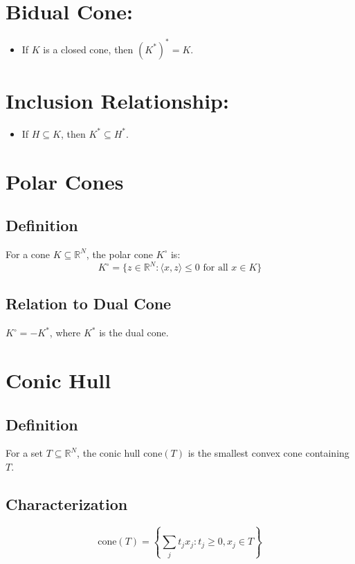 \documentclass{article}
\begin{document}
\section*{Bidual Cone:}
\begin{itemize}
    \item If $K$ is a closed cone, then $(K^*)^* = K$.
\end{itemize}

\section*{Inclusion Relationship:}
\begin{itemize}
    \item If $H \subseteq K$, then $K^* \subseteq H^*$.
\end{itemize}




\section*{Polar Cones}

\subsection*{Definition}
For a cone \( K \subseteq \mathbb{R}^N \), the polar cone \( K^\circ \) is:
\[
K^\circ = \{ z \in \mathbb{R}^N : \langle x, z \rangle \leq 0 \text{ for all } x \in K \}
\]

\subsection*{Relation to Dual Cone}
\( K^\circ = -K^* \), where \( K^* \) is the dual cone.

\section*{Conic Hull}

\subsection*{Definition}
For a set \( T \subseteq \mathbb{R}^N \), the conic hull \( \text{cone}(T) \) is the smallest convex cone containing \( T \).

\subsection*{Characterization}
\[
\text{cone}(T) = \left\{ \sum_{j} t_j x_j : t_j \geq 0, x_j \in T \right\}
\]
\end{document}
